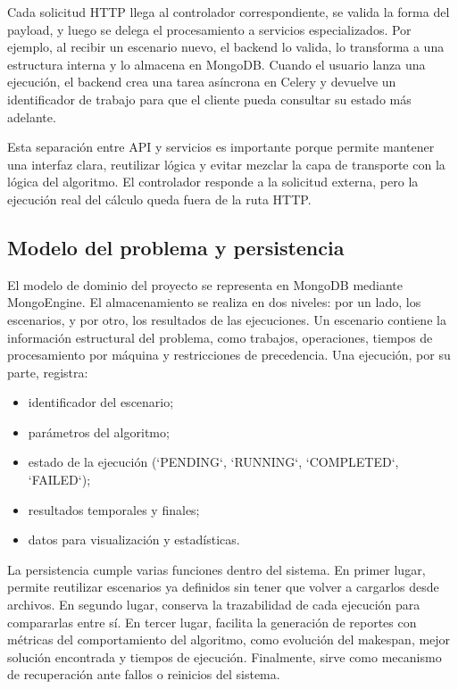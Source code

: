 \documentclass[11pt,a4paper]{article}
\begin{document}
Cada solicitud HTTP llega al controlador correspondiente, se valida la forma del payload, y luego se delega el procesamiento a servicios especializados. Por ejemplo, al recibir un escenario nuevo, el backend lo valida, lo transforma a una estructura interna y lo almacena en MongoDB. Cuando el usuario lanza una ejecución, el backend crea una tarea asíncrona en Celery y devuelve un identificador de trabajo para que el cliente pueda consultar su estado más adelante.

Esta separación entre API y servicios es importante porque permite mantener una interfaz clara, reutilizar lógica y evitar mezclar la capa de transporte con la lógica del algoritmo. El controlador responde a la solicitud externa, pero la ejecución real del cálculo queda fuera de la ruta HTTP.

\subsection{Modelo del problema y persistencia}

El modelo de dominio del proyecto se representa en MongoDB mediante MongoEngine. El almacenamiento se realiza en dos niveles: por un lado, los escenarios, y por otro, los resultados de las ejecuciones. Un escenario contiene la información estructural del problema, como trabajos, operaciones, tiempos de procesamiento por máquina y restricciones de precedencia. Una ejecución, por su parte, registra:

\begin{itemize}
    \item identificador del escenario;
    \item parámetros del algoritmo;
    \item estado de la ejecución (`PENDING`, `RUNNING`, `COMPLETED`, `FAILED`);
    \item resultados temporales y finales;
    \item datos para visualización y estadísticas.
\end{itemize}

La persistencia cumple varias funciones dentro del sistema. En primer lugar, permite reutilizar escenarios ya definidos sin tener que volver a cargarlos desde archivos. En segundo lugar, conserva la trazabilidad de cada ejecución para compararlas entre sí. En tercer lugar, facilita la generación de reportes con métricas del comportamiento del algoritmo, como evolución del makespan, mejor solución encontrada y tiempos de ejecución. Finalmente, sirve como mecanismo de recuperación ante fallos o reinicios del sistema.
\end{document}
